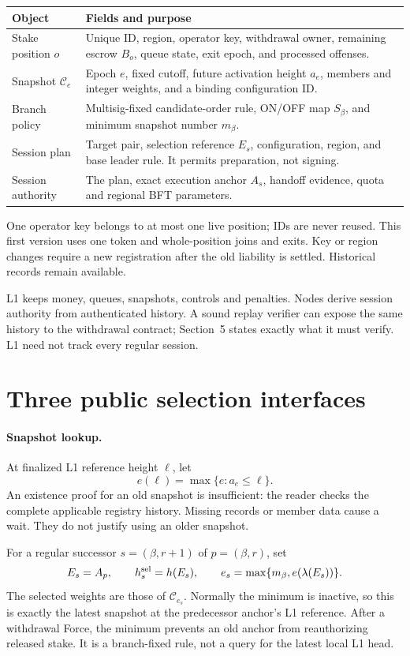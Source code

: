 \documentclass[11pt,a4paper]{article}
\newcommand{\cfg}{\mathcal C}
\begin{document}
\begin{tabularx}{\linewidth}{@{}p{.24\linewidth}Y@{}}\toprule
Object & Fields and purpose\\\midrule
Stake position $o$ & Unique ID, region, operator key, withdrawal owner,
remaining escrow $B_o$, queue state, exit epoch, and processed offenses.\\
Snapshot $\cfg_e$ & Epoch $e$, fixed cutoff, future activation height $a_e$,
members and integer weights, and a binding configuration ID.\\
Branch policy & Multisig-fixed candidate-order rule, ON/OFF map $S_\beta$,
and minimum snapshot number $m_\beta$.\\
Session plan & Target pair, selection reference $E_s$, configuration,
region, and base leader rule. It permits preparation, not signing.\\
Session authority & The plan, exact execution anchor $A_s$, handoff
evidence, quota and regional BFT parameters.\\\bottomrule
\end{tabularx}

One operator key belongs to at most one live position; IDs are never
reused. This first version uses one token and whole-position joins and
exits. Key or region changes require a new registration after the old
liability is settled. Historical records remain available.

L1 keeps money, queues, snapshots, controls and penalties. Nodes derive
session authority from authenticated history. A sound replay verifier
can expose the same history to the withdrawal contract; Section~5 states
exactly what it must verify. L1 need not track every regular session.

\newpage
\section{Three public selection interfaces}
\label{sec:selection}
\paragraph{Snapshot lookup.}
At finalized L1 reference height $\ell$, let
\[
 e(\ell)=\max\{e:a_e\le\ell\}.
\]
An existence proof for an old snapshot is insufficient: the reader checks
the complete applicable registry history. Missing records or member data
cause a wait. They do not justify using an older snapshot.

For a regular successor $s=(\beta,r+1)$ of $p=(\beta,r)$, set
\begin{equation}\label{eq:reference}
 E_s=A_p,\qquad h_s^{\rm sel}=h(E_s),\qquad
 e_s=\max\{m_\beta,e(\lambda(E_s))\}.
\end{equation}
The selected weights are those of $\cfg_{e_s}$. Normally the minimum is
inactive, so this is exactly the latest snapshot at the predecessor
anchor's L1 reference. After a withdrawal Force, the minimum prevents an
old anchor from reauthorizing released stake. It is a branch-fixed rule,
not a query for the latest local L1 head.
\end{document}
